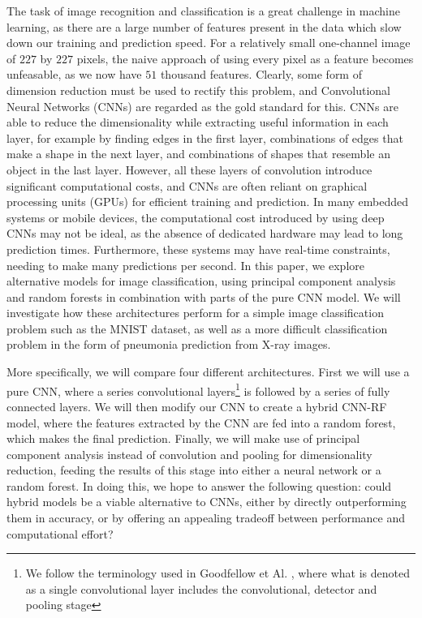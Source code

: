\documentclass[onecolumn,10pt,cleanfoot]{asme2ej}
\begin{document}
The task of image recognition and classification is a great challenge in machine learning, as there are a large number of features present in the data which slow down our training and prediction speed. For a relatively small one-channel image of $227$ by $227$ pixels, the naive approach of using every pixel as a feature becomes unfeasable, as we now have $51$ thousand features. Clearly, some form of dimension reduction must be used to rectify this problem, and Convolutional Neural Networks (CNNs) are regarded as the gold standard for this. CNNs are able to reduce the dimensionality while extracting useful information in each layer, for example by finding edges in the first layer, combinations of edges that make a shape in the next layer, and combinations of shapes that resemble an object in the last layer. However, all these layers of convolution introduce significant computational costs, and CNNs are often reliant on graphical processing units (GPUs) for efficient training and prediction. In many embedded systems or mobile devices, the computational cost introduced by using deep CNNs may not be ideal, as the absence of dedicated hardware may lead to long prediction times. Furthermore, these systems may have real-time constraints, needing to make many predictions per second. In this paper, we explore alternative models for image classification, using principal component analysis and random forests in combination with parts of the pure CNN model. We will investigate how these architectures perform for a simple image classification problem such as the MNIST dataset, as well as a more difficult classification problem in the form of pneumonia prediction from X-ray images. 

More specifically, we will compare four different architectures. First we will use a pure CNN, where a series convolutional layers\footnote{We follow the terminology used in Goodfellow et Al. \cite[336]{gbc}, where what is denoted as a single convolutional layer includes the convolutional, detector and pooling stage} is followed by a series of fully connected layers. We will then modify our CNN to create a hybrid CNN-RF model, where the features extracted by the CNN are fed into a random forest, which makes the final prediction. Finally, we will make use of principal component analysis instead of convolution and pooling for dimensionality reduction, feeding the results of this stage into either a neural network or a random forest. In doing this, we hope to answer the following question: could hybrid models be a viable alternative to CNNs, either by directly outperforming them in accuracy, or by offering an appealing tradeoff between performance and computational effort?
\end{document}
